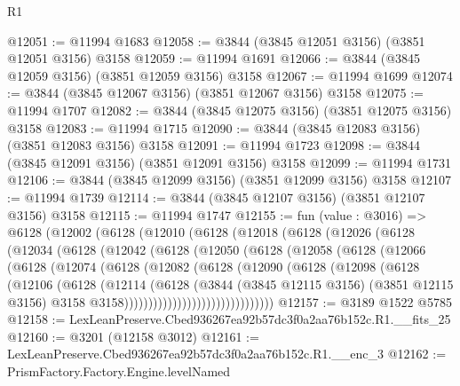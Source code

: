 \begin{lexlean}{R1}
\begin{coremodule}
@12051 := @11994 @1683
@12058 := @3844 (@3845 @12051 @3156) (@3851 @12051 @3156) @3158
@12059 := @11994 @1691
@12066 := @3844 (@3845 @12059 @3156) (@3851 @12059 @3156) @3158
@12067 := @11994 @1699
@12074 := @3844 (@3845 @12067 @3156) (@3851 @12067 @3156) @3158
@12075 := @11994 @1707
@12082 := @3844 (@3845 @12075 @3156) (@3851 @12075 @3156) @3158
@12083 := @11994 @1715
@12090 := @3844 (@3845 @12083 @3156) (@3851 @12083 @3156) @3158
@12091 := @11994 @1723
@12098 := @3844 (@3845 @12091 @3156) (@3851 @12091 @3156) @3158
@12099 := @11994 @1731
@12106 := @3844 (@3845 @12099 @3156) (@3851 @12099 @3156) @3158
@12107 := @11994 @1739
@12114 := @3844 (@3845 @12107 @3156) (@3851 @12107 @3156) @3158
@12115 := @11994 @1747
@12155 := fun (value : @3016) =>
  @6128
    (@12002
      (@6128
        (@12010
          (@6128
            (@12018
              (@6128
                (@12026
                  (@6128
                    (@12034
                      (@6128
                        (@12042
                          (@6128
                            (@12050
                              (@6128
                                (@12058
                                  (@6128
                                    (@12066
                                      (@6128
                                        (@12074
                                          (@6128
                                            (@12082
                                              (@6128
                                                (@12090
                                                  (@6128
                                                    (@12098
                                                      (@6128
                                                        (@12106
                                                          (@6128
                                                            (@12114
                                                              (@6128
                                                                (@3844
                                                                  (@3845 @12115 @3156)
                                                                  (@3851 @12115 @3156)
                                                                  @3158
                                                                  @3158)))))))))))))))))))))))))))))))
@12157 := @3189 @1522 @5785
@12158 := LexLeanPreserve.Cbed936267ea92b57dc3f0a2aa76b152c.R1.__fits_25
@12160 := @3201 (@12158 @3012)
@12161 := LexLeanPreserve.Cbed936267ea92b57dc3f0a2aa76b152c.R1.__enc_3
@12162 := PrismFactory.Factory.Engine.levelNamed

\end{coremodule}
\end{lexlean}
